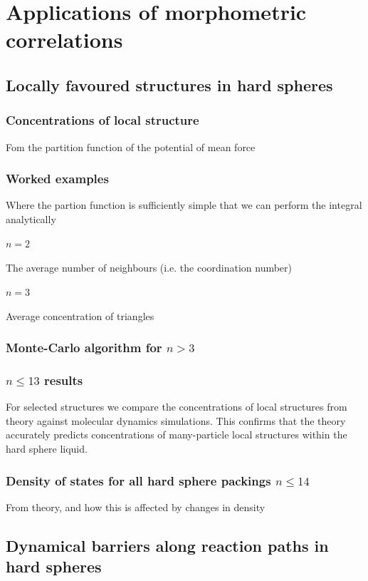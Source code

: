 \documentclass[12pt]{report}
\begin{document}
\chapter{Applications of morphometric correlations}

\section{Locally favoured structures in hard spheres}
\subsection{Concentrations of local structure}
Fom the partition function of the potential of mean force
\subsection{Worked examples}
Where the partion function is sufficiently simple that we can perform the integral analytically
\subsubsection{$n = 2$}
The average number of neighbours (i.e. the coordination number)
\subsubsection{$n = 3$}
Average concentration of triangles
\subsection{Monte-Carlo algorithm for $n > 3$}
\subsection{$n \le 13$ results}
For selected structures we compare the concentrations of local structures from theory against molecular dynamics simulations.
This confirms that the theory accurately predicts concentrations of many-particle local structures within the hard sphere liquid.
\subsection{Density of states for all hard sphere packings $n \le 14$}
From theory, and how this is affected by changes in density

\section{Dynamical barriers along reaction paths in hard spheres}
\end{document}
